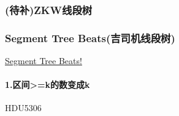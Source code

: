 \documentclass[
]{article}
\begin{document}
\hypertarget{ux5f85ux8865zkwux7ebfux6bb5ux6811}{%
\subsubsection{(待补)ZKW线段树}\label{ux5f85ux8865zkwux7ebfux6bb5ux6811}}

\hypertarget{segment-tree-beatsux5409ux53f8ux673aux7ebfux6bb5ux6811}{%
\subsubsection{Segment Tree
Beats(吉司机线段树)}\label{segment-tree-beatsux5409ux53f8ux673aux7ebfux6bb5ux6811}}

\href{http://c-sunshine.blog.uoj.ac/blog/1270}{Segment Tree Beats!}

\hypertarget{ux533aux95f4kux7684ux6570ux53d8ux6210k}{%
\paragraph{1.区间\textgreater=k的数变成k}\label{ux533aux95f4kux7684ux6570ux53d8ux6210k}}

HDU5306
\end{document}

